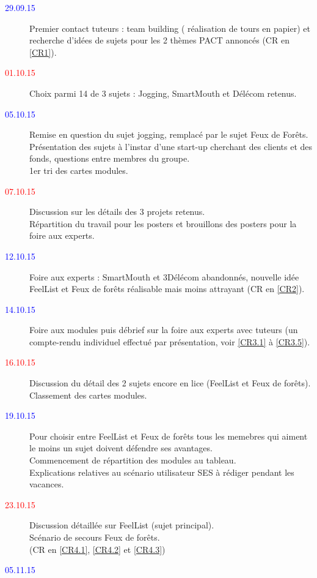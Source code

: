 	\begin{description}
		\item[\textcolor{Blue}{29.09.15}]
			Premier contact tuteurs : team building ( réalisation de tours en papier) et recherche d'idées de sujets pour les 2 thèmes PACT annoncés (CR en \ref{CR1}).
		\item[\textcolor{Red}{01.10.15}]
			Choix parmi 14 de 3 sujets : Jogging, SmartMouth et Délécom retenus.
		\item[\textcolor{Blue}{05.10.15}]
			Remise en question du sujet jogging, remplacé par le sujet Feux de Forêts.\\
			Présentation des sujets à l'instar d'une start-up cherchant des clients et des fonds, questions entre membres du groupe.\\
			1er tri des cartes modules.
		\item[\textcolor{Red}{07.10.15}]
			Discussion sur les détails des 3 projets retenus.\\
			Répartition du travail pour les posters et brouillons des posters pour la foire aux experts.
		\item[\textcolor{Blue}{12.10.15}]
			Foire aux experts : SmartMouth et 3Délécom abandonnés, nouvelle idée FeelList et Feux de forêts réalisable mais moins attrayant (CR en \ref{CR2}).
		\item[\textcolor{Blue}{14.10.15}]
			Foire aux modules puis débrief sur la foire aux experts avec tuteurs (un compte-rendu individuel effectué par présentation, voir \ref{CR3.1} à \ref{CR3.5}).
		\item[\textcolor{Red}{16.10.15}]
			Discussion du détail des 2 sujets encore en lice (FeelList et Feux de forêts).\\
			Classement des cartes modules.
		\item[\textcolor{Blue}{19.10.15}]
			Pour choisir entre FeelList et Feux de forêts tous les memebres qui aiment le moins un sujet doivent défendre ses avantages.\\
			Commencement de répartition des modules au tableau.\\
			Explications relatives au scénario utilisateur SES à rédiger pendant les vacances.
		\item[\textcolor{Red}{23.10.15}]
			Discussion détaillée sur FeelList (sujet principal).\\
			Scénario de secours Feux de forêts.\\
			(CR en \ref{CR4.1}, \ref{CR4.2} et \ref{CR4.3})
		\item[\textcolor{Blue}{05.11.15}]

\end{description}
